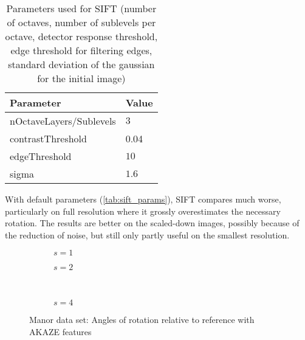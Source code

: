 \begin{table}
   \begin{center}
      \begin{tabular}{>{\ttfamily}ll}
         \rowcolor{white}
         \toprule
         \rmfamily Parameter     & Value \\
         \midrule
         nOctaveLayers/Sublevels & $3$ \\
         contrastThreshold       & 0.04 \\
         edgeThreshold           & $10$ \\
         sigma                   & $1.6$ \\
         \bottomrule
      \end{tabular}
      \caption{Parameters used for SIFT (number of octaves, number of sublevels
      per octave, detector response threshold, edge threshold for filtering
   edges, standard deviation of the gaussian for the initial image)}
      \label{tab:sift_params}
   \end{center}
\end{table}

With default parameters (\autoref{tab:sift_params}), SIFT compares much worse,
particularly on full resolution where it grossly overestimates the necessary
rotation. The results are better on the scaled-down images, possibly because of
the reduction of noise, but still only partly useful on the smallest resolution.

\begin{figure}
   \begin{subfigure}{.5\linewidth}
      \centering      
      
      \label{fig:manor_KAZE_rotation_1}
      \caption{$s=1$}
   \end{subfigure}
   \quad
   \begin{subfigure}{.5\linewidth}
      \centering      
      
      \label{fig:manor_KAZE_rotation_2}
      \caption{$s=2$}
   \end{subfigure}\\[3ex]
   \begin{subfigure}{\linewidth}
      \centering      
      
      \label{fig:manor_KAZE_rotation_4}
      \caption{$s=4$}
   \end{subfigure}
   \caption[Manor data: Rotation AKAZE]{Manor data set: Angles of rotation relative to reference with
   AKAZE features}
   \label{fig:manor_KAZE_rotation}
\end{figure}

